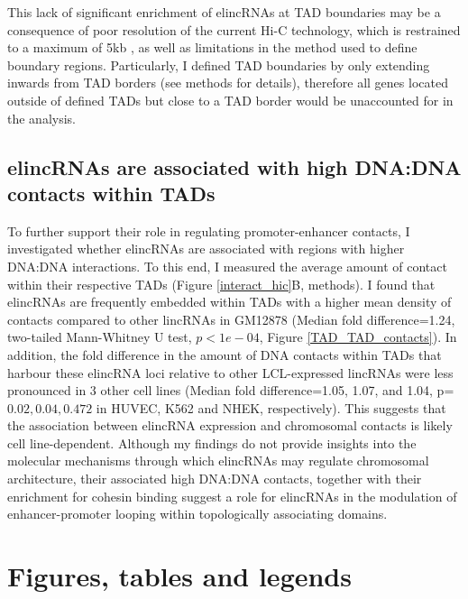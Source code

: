 \documentclass[11pt,a4paper]{report}
\begin{document}
This lack of significant enrichment of elincRNAs at TAD boundaries may be a consequence of poor resolution of the current Hi-C technology, which is restrained to a maximum of 5kb \cite{Rao2014}⁠, as well as limitations in the method used to define boundary regions. Particularly, I defined TAD boundaries by only extending inwards from TAD borders (see methods for details), therefore all genes located outside of defined TADs but close to a TAD border would be unaccounted for in the analysis. 


\subsection*{elincRNAs are associated with high DNA:DNA contacts within TADs}

To further support their role in regulating promoter-enhancer contacts, I investigated whether elincRNAs are associated with regions with higher DNA:DNA interactions. To this end, I measured the average amount of contact within their respective TADs (Figure \ref{interact_hic}B, methods). I found that elincRNAs are frequently embedded within TADs with a higher mean density of contacts compared to other lincRNAs in GM12878 (Median fold difference=1.24, two-tailed Mann-Whitney U test, $p<1e-04$, Figure \ref{TAD_TAD_contacts}). In addition, the fold difference in the amount of DNA contacts within TADs that harbour these elincRNA loci relative to other LCL-expressed lincRNAs were less pronounced in 3 other cell lines (Median fold difference=1.05, 1.07, and 1.04, p=$0.02, 0.04, 0.472$ in HUVEC, K562 and NHEK, respectively). This suggests that the association between elincRNA expression and chromosomal contacts is likely cell line-dependent. 
Although my findings do not provide insights into the molecular mechanisms through which elincRNAs may regulate chromosomal architecture, their associated high DNA:DNA contacts, together with their enrichment for cohesin binding suggest a role for elincRNAs in the modulation of enhancer-promoter looping within topologically associating domains.

\section*{Figures, tables and legends}
\end{document}
